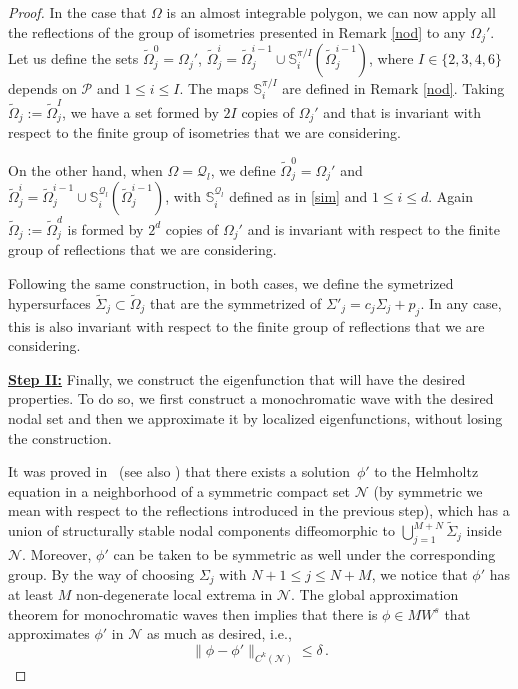 \documentclass{amsart}
\theoremstyle{definition}
\theoremstyle{remark}
\newcommand{\Si}{\Sigma}
\newcommand{\Om}{\Omega}
\renewcommand\leq\leqslant
\numberwithin{equation}{section}
\theoremstyle{definition}
\theoremstyle{remark}
\begin{document}
\begin{proof}
In the case that $\Om$ is an almost integrable polygon, we can now apply all the reflections of the group of isometries presented in Remark \ref{nod} to any $\Om_j'$. Let us define the sets $\tilde{\Om}_j^0=\Om_j'$, $\tilde{\Om}_j^i=\tilde{\Om}_j^{i-1}\cup\mathbb{S}_i^{\pi/I}\left(\tilde{\Om}_j^{i-1}\right)$, where $I\in\{2,3,4,6\}$ depends on $\mathcal{P}$ and $1\leq i\leq I$. The maps $\mathbb{S}_i^{\pi/I}$ are defined in Remark \ref{nod}. Taking $\tilde{\Om}_j:=\tilde{\Om}_j^I$, we have a set formed by $2I$ copies of $\Om_j'$  and that is invariant with respect to the finite group of isometries that we are considering. 

On the other hand, when $\Om=\mathcal{Q}_l$, we define $\tilde{\Om}_j^0=\Om_j'$ and  $\tilde{\Om}_j^i=\tilde{\Om}_j^{i-1}\cup\mathbb{S}_i^{\mathcal{Q}_l}\left(\tilde{\Om}_j^{i-1}\right)$, with $\mathbb{S}_i^{\mathcal{Q}_l}$ defined as in \eqref{sim} and $1\leq i\leq d$. Again $\tilde{\Om}_j:=\tilde{\Om}_j^d$ is formed by $2^d$ copies of $\Om_j'$  and is invariant with respect to the finite group of reflections that we are considering. 

Following the same construction, in both cases, we define the symetrized hypersurfaces $\tilde{\Sigma}_j\subset\tilde{\Om}_j$ that are the symmetrized of $\Si'_j=c_j \Si_j+p_j$. In any case, this is also invariant with respect to the finite group of reflections that we are considering. 

\textbf{	\underline{Step II:}} Finally, we construct the eigenfunction that will have the desired properties. To do so, we first construct a monochromatic wave with the desired nodal set and then we approximate it by localized eigenfunctions, without losing the construction. 

It was proved in~\cite[Theorem 2.2.]{APDE} (see also \cite[Proposition 3.2.]{EP15}) that there exists a  solution~$\phi'$ to the Helmholtz equation in a neighborhood of a symmetric compact set $\mathcal N$ (by symmetric we mean with respect to the reflections introduced in the previous step), which has a union of structurally stable nodal components diffeomorphic to $\bigcup_{j=1}^{M+N}\tilde{\Si}_j$ inside $\mathcal N$. Moreover, $\phi'$ can be taken to be symmetric as well under the corresponding group. By the way of choosing $\Si_j$ with $N+1\leq j\leq N+M$, we notice that $\phi'$ has at least $M$ non-degenerate local extrema in $\mathcal N$. The global approximation theorem for monochromatic waves then implies that there is $\phi\in MW^s$ that approximates $\phi'$ in $\mathcal N$ as much as desired, i.e.,
\begin{equation}
\|\phi-\phi'\|_{C^k(\mathcal N)}\leq \delta\,.
\end{equation}


\end{proof}
\end{document}
